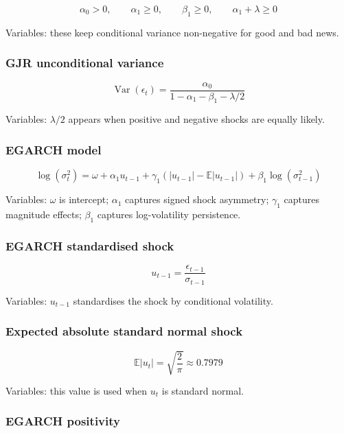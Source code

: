 \documentclass[
  8pt,
  twocolumn]{extarticle}
\begin{document}
\[
\alpha_0>0,\qquad \alpha_1\ge0,\qquad \beta_1\ge0,\qquad \alpha_1+\lambda\ge0
\]

Variables: these keep conditional variance non-negative for good and bad
news.

\subsubsection{GJR unconditional
variance}\label{gjr-unconditional-variance}

\[
\operatorname{Var}(\epsilon_t)=\frac{\alpha_0}{1-\alpha_1-\beta_1-\lambda/2}
\]

Variables: \(\lambda/2\) appears when positive and negative shocks are
equally likely.

\subsubsection{EGARCH model}\label{egarch-model}

\[
\log(\sigma_t^2)=\omega+\alpha_1u_{t-1}+\gamma_1(|u_{t-1}|-\mathbb E|u_{t-1}|)+\beta_1\log(\sigma_{t-1}^2)
\]

Variables: \(\omega\) is intercept; \(\alpha_1\) captures signed shock
asymmetry; \(\gamma_1\) captures magnitude effects; \(\beta_1\) captures
log-volatility persistence.

\subsubsection{EGARCH standardised
shock}\label{egarch-standardised-shock}

\[
u_{t-1}=\frac{\epsilon_{t-1}}{\sigma_{t-1}}
\]

Variables: \(u_{t-1}\) standardises the shock by conditional volatility.

\subsubsection{Expected absolute standard normal
shock}\label{expected-absolute-standard-normal-shock}

\[
\mathbb E|u_t|=\sqrt{\frac{2}{\pi}}\approx0.7979
\]

Variables: this value is used when \(u_t\) is standard normal.

\subsubsection{EGARCH positivity}\label{egarch-positivity}
\end{document}
